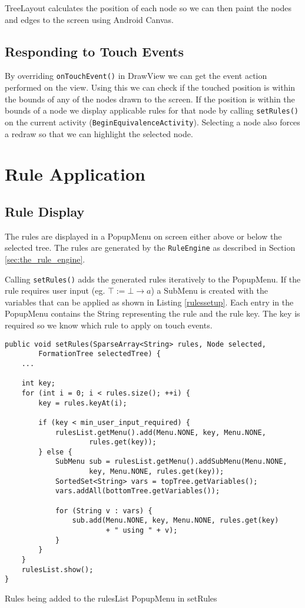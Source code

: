 \documentclass{report}
\begin{document}
TreeLayout calculates the position of each node so we can then paint the nodes and edges to the screen using Android Canvas.

\subsection{Responding to Touch Events}

By overriding {\tt onTouchEvent()} in DrawView we can get the event action performed on the view. Using this we can check if the touched position is within the bounds of any of the nodes drawn to the screen. If the position is within the bounds of a node we display applicable rules for that node by calling {\tt setRules()} on the current activity ({\tt BeginEquivalenceActivity}). Selecting a node also forces a redraw so that we can highlight the selected node.

\section{Rule Application}

\subsection{Rule Display}

The rules are displayed in a PopupMenu on screen either above or below the selected tree. The rules are generated by the {\tt RuleEngine} as described in Section \ref{sec:the_rule_engine}.

Calling {\tt setRules()} adds the generated rules iteratively to the PopupMenu. If the rule requires user input (eg. $\top := \bot \to a$) a SubMenu is created with the variables that can be applied as shown in Listing \ref{rulessetup}. Each entry in the PopupMenu contains the String representing the rule and the rule key. The key is required so we know which rule to apply on touch events.

\begin{listing}[ht]
\begin{verbatim}
public void setRules(SparseArray<String> rules, Node selected, 
        FormationTree selectedTree) {
    ...

    int key;
    for (int i = 0; i < rules.size(); ++i) {
        key = rules.keyAt(i);

        if (key < min_user_input_required) {
            rulesList.getMenu().add(Menu.NONE, key, Menu.NONE, 
                    rules.get(key));
        } else {
            SubMenu sub = rulesList.getMenu().addSubMenu(Menu.NONE, 
                    key, Menu.NONE, rules.get(key));
            SortedSet<String> vars = topTree.getVariables();
            vars.addAll(bottomTree.getVariables());

            for (String v : vars) {
                sub.add(Menu.NONE, key, Menu.NONE, rules.get(key) 
                        + " using " + v);
            }
        }
    }
    rulesList.show();
}
\end{verbatim}
\caption{Rules being added to the rulesList PopupMenu in setRules}
\label{rulessetup}
\end{listing}
\end{document}
